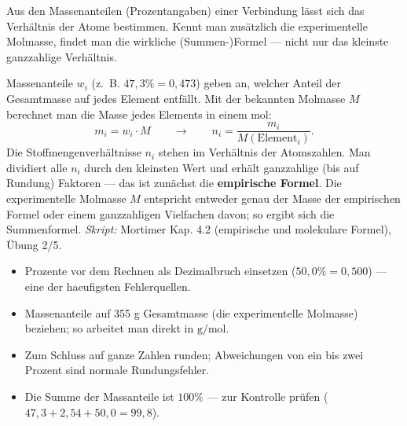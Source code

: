

Aus den Massenanteilen (Prozentangaben) einer Verbindung lässt sich das
Verhältnis der Atome bestimmen. Kennt man zusätzlich die experimentelle
Molmasse, findet man die wirkliche (Summen-)Formel --- nicht nur das
kleinste ganzzahlige Verhältnis.

\begin{werkzeugkasten}
Massenanteile $w_i$ (z.~B. $47{,}3\% = 0{,}473$) geben an, welcher Anteil der
Gesamtmasse auf jedes Element entfällt. Mit der bekannten Molmasse $M$
berechnet man die Masse jedes Elements in einem mol:
\begin{equation}
  m_i = w_i \cdot M\qquad\rightarrow\qquad
  n_i = \frac{m_i}{M(\mathrm{Element}_i)}.
\end{equation}
Die Stoffmengenverhältnisse $n_i$ stehen im Verhältnis der Atomszahlen. Man
dividiert alle $n_i$ durch den kleinsten Wert und erhält ganzzahlige (bis auf
Rundung) Faktoren --- das ist zunächst die \textbf{empirische Formel}. Die
experimentelle Molmasse $M$ entspricht entweder genau der Masse der empirischen
Formel oder einem ganzzahligen Vielfachen davon; so ergibt sich die
Summenformel.
\textit{Skript:} Mortimer Kap. 4.2 (empirische und molekulare Formel),
Übung 2/5.
\end{werkzeugkasten}

\begin{achtung}
\begin{itemize}
  \item Prozente vor dem Rechnen als Dezimalbruch einsetzen
        ($50{,}0\% = 0{,}500$) --- eine der haeufigsten Fehlerquellen.
  \item Massenanteile auf 355 g Gesamtmasse (die experimentelle Molmasse)
        beziehen; so arbeitet man direkt in $\mathrm{g/mol}$.
  \item Zum Schluss auf ganze Zahlen runden; Abweichungen von ein bis zwei
        Prozent sind normale Rundungsfehler.
  \item Die Summe der Massanteile ist $100\%$ --- zur Kontrolle prüfen
        ($47{,}3+2{,}54+50{,}0 = 99{,}8$).
\end{itemize}
\end{achtung}
